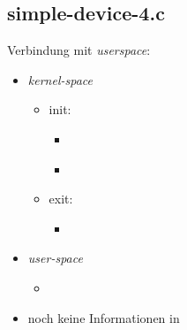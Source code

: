 \subsection{simple-device-4.c}
\begin{frame}{}{Verbindung mit {\em userspace}: }
\begin{itemize}
 \item {\em kernel-space}
 \begin{itemize}
  \item init:
  \begin{itemize}
  \item {}
  \item \href{https://elixir.bootlin.com/linux/latest/source/include/linux/device.h\#L523}
       {}
  \end{itemize}     
  \item exit:
  \begin{itemize} 
  \item \href{https://elixir.bootlin.com/linux/latest/source/include/linux/device.h\#L519}
      {}
  \end{itemize}
 \end{itemize}
 \item {\em user-space}
 \begin{itemize}
  \item {}
 \end{itemize}
 \item noch keine Informationen in 
\end{itemize}
\end{frame}

